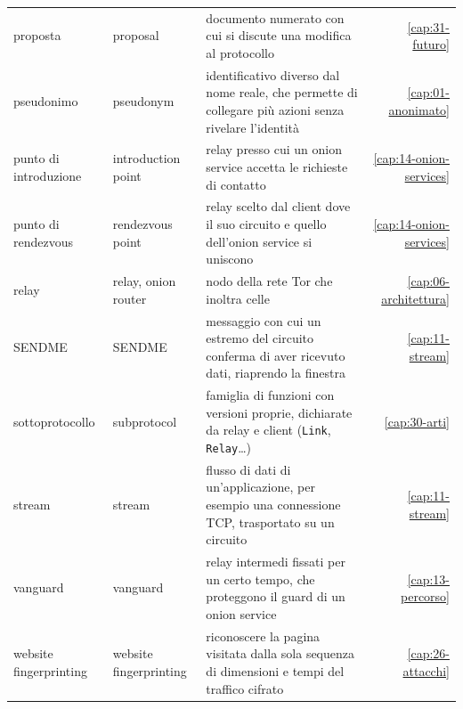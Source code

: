 {\begin{longtable}{@{}>{\raggedright\arraybackslash}p{3.2cm}>{\raggedright\arraybackslash}p{3.2cm}>{\raggedright\arraybackslash}p{6.6cm}r@{}}
proposta & proposal & documento numerato con cui si discute una modifica al protocollo & \ref{cap:31-futuro} \\
pseudonimo & pseudonym & identificativo diverso dal nome reale, che permette di collegare più azioni senza rivelare l'identità & \ref{cap:01-anonimato} \\
punto di introduzione & introduction point & relay presso cui un onion service accetta le richieste di contatto & \ref{cap:14-onion-services} \\
punto di rendezvous & rendezvous point & relay scelto dal client dove il suo circuito e quello dell'onion service si uniscono & \ref{cap:14-onion-services} \\
relay & relay, onion router & nodo della rete Tor che inoltra celle & \ref{cap:06-architettura} \\
SENDME & SENDME & messaggio con cui un estremo del circuito conferma di aver ricevuto dati, riaprendo la finestra & \ref{cap:11-stream} \\
sottoprotocollo & subprotocol & famiglia di funzioni con versioni proprie, dichiarate da relay e client (\texttt{Link}, \texttt{Relay}\ldots) & \ref{cap:30-arti} \\
stream & stream & flusso di dati di un'applicazione, per esempio una connessione TCP, trasportato su un circuito & \ref{cap:11-stream} \\
vanguard & vanguard & relay intermedi fissati per un certo tempo, che proteggono il guard di un onion service & \ref{cap:13-percorso} \\
website fingerprinting & website fingerprinting & riconoscere la pagina visitata dalla sola sequenza di dimensioni e tempi del traffico cifrato & \ref{cap:26-attacchi} \\
\end{longtable}
}
